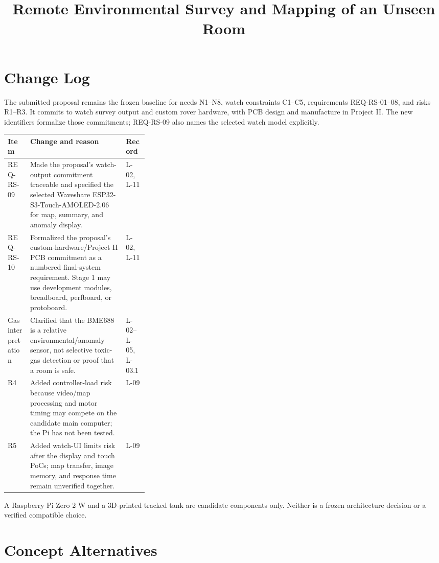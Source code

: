 \documentclass[conference,onecolumn,letterpaper]{IEEEtran}
\title{Remote Environmental Survey and Mapping of an Unseen Room}
\author{\IEEEauthorblockN{Julian Joseph Amaro}\IEEEauthorblockA{Project I (247-519-VA), Vanier College\\November 20, 2026}}
\begin{document}
\maketitle

\section{Change Log}

The submitted proposal remains the frozen baseline for needs N1--N8, watch constraints C1--C5, requirements REQ-RS-01--08, and risks R1--R3. It commits to watch survey output and custom rover hardware, with PCB design and manufacture in Project II. The new identifiers formalize those commitments; REQ-RS-09 also names the selected watch model explicitly.

\noindent\begin{tabularx}{\linewidth}{>{\raggedright\arraybackslash}p{0.16\linewidth}X>{\raggedright\arraybackslash}p{0.16\linewidth}}
\toprule
\textbf{Item} & \textbf{Change and reason} & \textbf{Record} \\
\midrule
REQ-RS-09 & Made the proposal's watch-output commitment traceable and specified the selected Waveshare ESP32-S3-Touch-AMOLED-2.06 for map, summary, and anomaly display. & L-02, L-11 \\
REQ-RS-10 & Formalized the proposal's custom-hardware/Project II PCB commitment as a numbered final-system requirement. Stage 1 may use development modules, breadboard, perfboard, or protoboard. & L-02, L-11 \\
Gas interpretation & Clarified that the BME688 is a relative environmental/anomaly sensor, not selective toxic-gas detection or proof that a room is safe. & L-02--L-05, L-03.1 \\
R4 & Added controller-load risk because video/map processing and motor timing may compete on the candidate main computer; the Pi has not been tested. & L-09 \\
R5 & Added watch-UI limits risk after the display and touch PoCs; map transfer, image memory, and response time remain unverified together. & L-09 \\
\bottomrule
\end{tabularx}

A Raspberry Pi Zero 2 W and a 3D-printed tracked tank are candidate components only. Neither is a frozen architecture decision or a verified compatible choice.

\section{Concept Alternatives}
\end{document}
